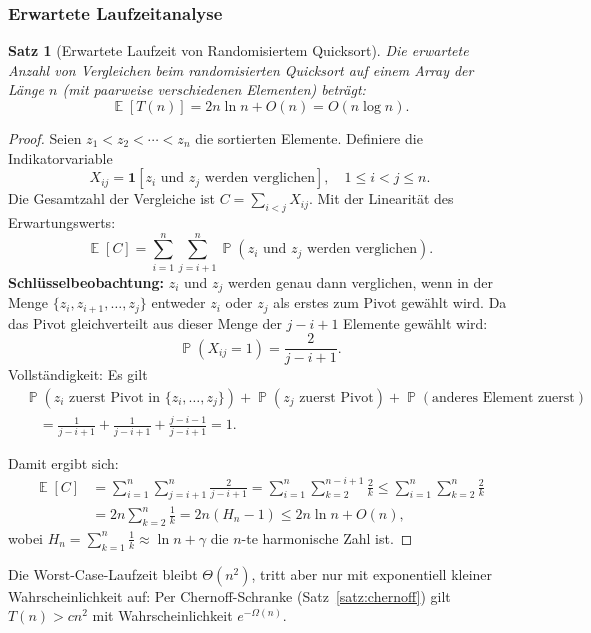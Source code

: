 ﻿\documentclass[12pt,a4paper]{article}
\theoremstyle{definition}
\theoremstyle{plain}
\newtheorem{satz}{Satz}[section]
\theoremstyle{remark}
\DeclareMathOperator{\E}{\mathbb{E}}
\DeclareMathOperator{\Prob}{\mathbb{P}}
\begin{document}
\subsubsection{Erwartete Laufzeitanalyse}

\begin{satz}[Erwartete Laufzeit von Randomisiertem Quicksort]\label{satz:ewrqs}
  Die erwartete Anzahl von Vergleichen beim randomisierten Quicksort
  auf einem Array der Länge $n$ (mit paarweise verschiedenen Elementen)
  beträgt:
  \[
    \E[T(n)] = 2n\ln n + O(n) = O(n \log n).
  \]
\end{satz}

\begin{proof}
  Seien $z_1 < z_2 < \cdots < z_n$ die sortierten Elemente. Definiere die
  Indikatorvariable
  \[
    X_{ij} = \mathbf{1}[\text{$z_i$ und $z_j$ werden verglichen}],
    \quad 1 \leq i < j \leq n.
  \]
  Die Gesamtzahl der Vergleiche ist $C = \sum_{i<j} X_{ij}$.
  Mit der Linearität des Erwartungswerts:
  \[
    \E[C] = \sum_{i=1}^{n}\sum_{j=i+1}^{n} \Prob(z_i \text{ und } z_j \text{ werden verglichen}).
  \]
  \textbf{Schlüsselbeobachtung:} $z_i$ und $z_j$ werden genau dann verglichen,
  wenn in der Menge $\{z_i, z_{i+1}, \ldots, z_j\}$ entweder $z_i$ oder
  $z_j$ als erstes zum Pivot gewählt wird. Da das Pivot gleichverteilt aus
  dieser Menge der $j-i+1$ Elemente gewählt wird:
  \[
    \Prob(X_{ij} = 1) = \frac{2}{j - i + 1}.
  \]
  Vollständigkeit: Es gilt
  \begin{align*}
    &\Prob(\text{$z_i$ zuerst Pivot in $\{z_i,\ldots,z_j\}$})
    + \Prob(\text{$z_j$ zuerst Pivot})
    + \Prob(\text{anderes Element zuerst}) \\
    &\quad= \frac{1}{j{-}i{+}1} + \frac{1}{j{-}i{+}1} + \frac{j{-}i{-}1}{j{-}i{+}1} = 1.
  \end{align*}

  Damit ergibt sich:
  \begin{align*}
    \E[C] &= \sum_{i=1}^{n}\sum_{j=i+1}^{n} \frac{2}{j-i+1}
    = \sum_{i=1}^{n}\sum_{k=2}^{n-i+1} \frac{2}{k}
    \leq \sum_{i=1}^{n}\sum_{k=2}^{n} \frac{2}{k} \\
    &= 2n \sum_{k=2}^{n} \frac{1}{k} = 2n\left(H_n - 1\right)
    \leq 2n \ln n + O(n),
  \end{align*}
  wobei $H_n = \sum_{k=1}^n \frac{1}{k} \approx \ln n + \gamma$ die $n$-te
  harmonische Zahl ist.
\end{proof}

Die Worst-Case-Laufzeit bleibt $\Theta(n^2)$, tritt aber nur mit exponentiell
kleiner Wahrscheinlichkeit auf: Per Chernoff-Schranke (Satz~\ref{satz:chernoff})
gilt $T(n) > cn^2$ mit Wahrscheinlichkeit $e^{-\Omega(n)}$.
\end{document}

